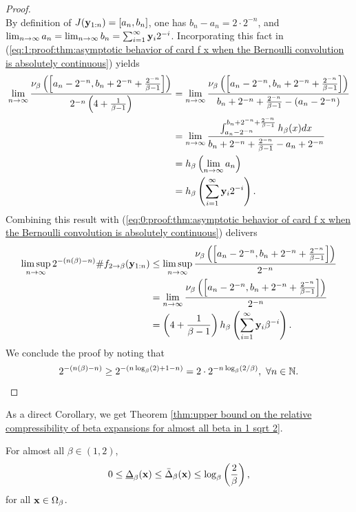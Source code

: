 \begin{proof}
\begin{equation}
    \end{equation}
    By definition of $J({\bf y}_{1:n}) = [a_n,b_n]$, one has $b_n - a_n = 2\cdot 2^{-n}$, and $\lim_{n \to \infty} a_n = \lim_{n \to \infty} b_n = \sum_{i=1}^\infty {\bf y}_i 2^{-i}$. Incorporating this fact in (\ref{eq:1:proof:thm:asymptotic behavior of card f x when the Bernoulli convolution is absolutely continuous}) yields
    \begin{align}
        \lim_{n \to \infty} \frac{\nu_\beta\left(\left[a_n- 2^{-n}, b_n + 2^{-n} + \frac{2^{-n}}{\beta-1}\right]\right)}{ 2^{-n}\left(4+\frac{1}{\beta-1}\right)}& = \lim_{n \to \infty} \frac{\nu_\beta\left(\left[a_n - 2^{-n}, b_n + 2^{-n} + \frac{2^{-n}}{\beta-1}\right]\right)}{b_n + 2^{-n} + \frac{2^{-n}}{\beta-1} - \left(a_n - 2^{-n}\right)}\\
        & = \lim_{n \to \infty} \frac{\int_{a_n - 2^{-n}}^{b_n + 2^{-n} + \frac{2^{-n}}{\beta-1}} h_\beta(x) dx}{b_n + 2^{-n} + \frac{2^{-n}}{\beta-1} - a_n + 2^{-n}}\\
        &= h_\beta\left( \lim_{n \to \infty} a_n \right)\\
        &= h_\beta\left( \sum_{i=1}^\infty {\bf y}_i 2^{-i}\right).
    \end{align}
    Combining this result with (\ref{eq:0:proof:thm:asymptotic behavior of card f x when the Bernoulli convolution is absolutely continuous}) delivers
    \begin{align}
        \limsup_{n\to \infty}2^{-(n(\beta)-n)} \# f_{2 \to \beta}({\bf y}_{1:n}) &\leq  \limsup_{n \to \infty}\frac{\nu_\beta\left(\left[a_n - 2^{-n}, b_n + 2^{-n} + \frac{2^{-n}}{\beta-1}\right]\right)}{ 2^{-n}}\\
        &= \lim_{n \to \infty}\frac{\nu_\beta\left(\left[a_n - 2^{-n}, b_n + 2^{-n} + \frac{2^{-n}}{\beta-1}\right]\right)}{ 2^{-n}}\\
        &= \left(4+ \frac{1}{\beta-1}\right)h_\beta\left( \sum_{i=1}^\infty {\bf y}_i \beta^{-i}\right).
    \end{align}
    We conclude the proof by noting that 
    \begin{equation}
        2^{-(n(\beta)-n)} \geq 2^{-(n\log_\beta(2) + 1 -n)} = 2 \cdot 2^{- n \log_\beta(2/\beta)}, \ \forall n \in \mathbb{N}. 
    \end{equation}
\end{proof}
\noindent As a direct Corollary, we get Theorem \ref{thm:upper bound on the relative compressibility of beta expansions for almost all beta in 1 sqrt 2}.
\begin{corollary}\label{cor:upper bound on the relative compressibility of beta expansions for almost all beta in 1 2}
    For almost all $\beta \in (1,2)$,
		\begin{equation}
			0 \leq \underline\Delta_\beta({\bf x}) \leq \bar\Delta_\beta({\bf x}) \leq \log_\beta\left(\frac{2}{\beta}\right),
		\end{equation}
		for all ${\bf x} \in \Omega_\beta$.
\end{corollary}

